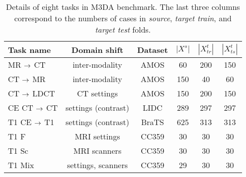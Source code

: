 

\begin{table}[h]
	\centering
	\caption{Details of eight tasks in M3DA benchmark. The last three columns correspond to the numbers of cases in \textit{source}, \textit{target train}, and \textit{target test} folds.}
	
		\begin{tabular}{@{}lccccc@{}}
			\toprule
			\textbf{Task name} & \textbf{Domain shift} & \textbf{Dataset} & $|X^s|$ & $|X^t_{tr}|$ & $|X^t_{ts}|$ \\
			\midrule
			MR $\rightarrow$ CT & inter-modality & AMOS & 60 & 200 & 150 \\
			CT $\rightarrow$ MR & inter-modality & AMOS & 150 & 40 & 60 \\
			CT $\rightarrow$ LDCT & CT settings & AMOS & 150 & 200 & 150 \\
			CE CT $\rightarrow$ CT & settings (contrast) & LIDC & 289 & 297 & 297 \\
			T1 CE $\rightarrow$ T1 & settings (contrast) & BraTS & 625 & 313 & 313 \\
			T1 F & MRI settings & CC359 & 30 & 30 & 30 \\
			T1 Sc & MRI scanners & CC359 & 30 & 30 & 30 \\
			T1 Mix & settings, scanners & CC359 & 29 & 30 & 30 \\
			\bottomrule
	\end{tabular}%
	\label{tab:setup}
	\vspace{2\baselineskip}
\end{table}
